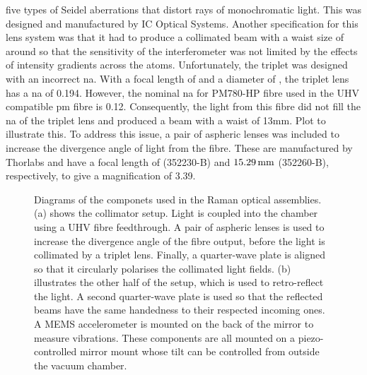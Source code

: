 five types of Seidel aberrations that distort rays of monochromatic light. This
was designed and manufactured by IC Optical Systems. Another specification for
this lens system was that it had to produce a collimated beam with a waist size
of around  so that the sensitivity of the
interferometer was not limited by the effects of intensity gradients across the
atoms. Unfortunately, the triplet was designed with an incorrect \ac{na}. With a
focal length of  and a diameter of
, the triplet lens has a \ac{na} of 0.194. However,
the nominal \ac{na} for PM780-HP fibre used in the UHV compatible \ac{pm} fibre
is 0.12. Consequently, the light from this fibre did not fill the \ac{na} of the
triplet lens and produced a beam with a waist of 13mm. {\huge Plot to illustrate
this}. To address this issue, a pair of aspheric lenses was included to increase
the divergence angle of light from the fibre. These are manufactured by Thorlabs
and have a focal length of  (352230-B) and
\(\sivalue{15.29}{\milli\metre}\) (352260-B), respectively, to give a
magnification of 3.39.
\begin{figure}[!htbp]
	\centering
	\def\svgwidth{\columnwidth}
	\subfloat[][]{\scalebox{0.4}{\label{fig:raman_collimator}}}
	\subfloat[][]{\scalebox{0.4}{\label{fig:mirror_mount}}}
	\caption[Drawings of the compenets used in the Raman optics
		assemblies]{Diagrams of the componets used in the Raman optical assemblies.
		(a) shows the collimator setup. Light is coupled into the chamber using a
		UHV fibre feedthrough. A pair of aspheric lenses is used to increase the
		divergence angle of the fibre output, before the light is collimated by a
		triplet lens. Finally, a quarter-wave plate is aligned so that it circularly
		polarises the collimated light fields. (b) illustrates the other half of the
		setup, which is used to retro-reflect the light. A second quarter-wave plate
		is used so that the reflected beams have the same handedness to their
		respected incoming ones. A MEMS accelerometer is mounted on the back of the
		mirror to measure vibrations. These components are all mounted on a
		piezo-controlled mirror mount whose tilt can be controlled from outside the
		vacuum chamber.}
	\label{fig:raman_optics}
\end{figure}
